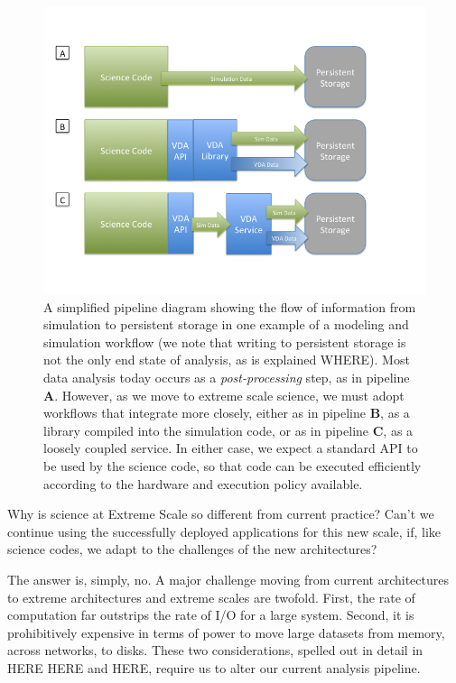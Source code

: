 
\begin{figure}
\begin{center}
\includegraphics[width=6in]{figures/three-data-flows}
\end{center}
\caption{ A simplified pipeline diagram showing the flow of information from simulation to persistent storage in one example of a modeling and simulation workflow (we note that writing to persistent storage is not the only end state of analysis, as is explained WHERE).  Most data analysis today occurs as a \emph{post-processing} step, as in pipeline \textbf{A}.  However, as we move to extreme scale science, we must adopt workflows that integrate \vda more closely, either as in pipeline \textbf{B}, as a library compiled into the simulation code, or as in pipeline \textbf{C}, as a loosely coupled service.  In either case, we expect a standard \vda API to be used by the science code, so that \vda code can be executed efficiently according to the hardware and execution policy available.
\label{simplepipeline}}
\end{figure}

Why is science at Extreme Scale so different from current practice?  Can't we
continue using the successfully deployed applications for this new scale, if, like science codes, we adapt to the challenges of the new architectures?

The answer is, simply, no.  A major challenge moving from current architectures to extreme architectures and extreme scales are twofold.  First, the rate of 
computation far outstrips the rate of I/O for a large system.  Second, it is
prohibitively expensive in terms of power to move large datasets from memory,
across networks, to disks.  These two considerations, spelled out in detail in
HERE HERE and HERE, require us to alter our current analysis pipeline.

